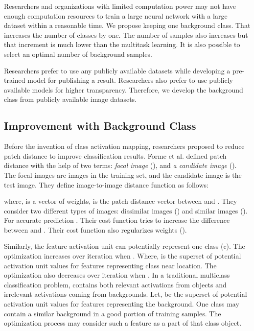\documentclass{article}
\begin{document}
Researchers and organizations with limited computation power may not have enough computation resources to train a large neural network with a large dataset within a reasonable time. We propose keeping one background class. That increases the number of classes by one. The number of samples also increases but that increment is much lower than the multitask learning. It is also possible to select an optimal number of background samples.  

Researchers prefer to use any publicly available datasets while developing a pre-trained model for publishing a result. Researchers also prefer to use publicly available models for higher transparency. Therefore, we develop the background class from publicly available image datasets.  

\subsection{Improvement with Background Class}
Before the invention of class activation mapping, researchers proposed to reduce patch distance \cite{zuo2014learning, frome2006image} to improve classification results. Forme et al. \cite{frome2006image} defined patch distance with the help of two terms: \emph{focal image} (), and \emph{a candidate image} (). The focal images are images in the training set, and the candidate image is the test image. They define image-to-image
distance function  as follows:

where,  is a vector of weights,  is the patch distance vector between  and .
They consider two different types of images: dissimilar images () and similar images (). For accurate prediction   . Their cost function tries to increase the difference between  and . Their cost function also regularizes weights ().

Similarly, the feature activation unit  can potentially represent one class (c). The optimization increases  over iteration when . Where,  is the superset of potential activation unit values for features representing class  near  location. The optimization also decreases  over iteration when . In a traditional multiclass classification problem,  contains both relevant activations from objects and irrelevant activations coming from backgrounds. Let,  be the superset of potential activation unit values for features representing the background. One class may contain a similar background in a good portion of training samples. The optimization process may consider such a feature as a part of that class object. 
\end{document}
